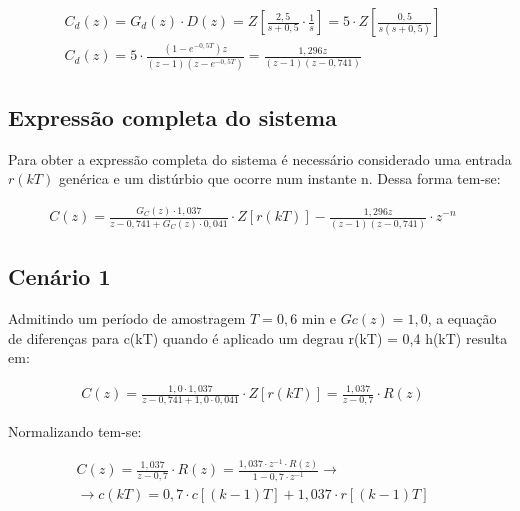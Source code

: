 \documentclass[a4paper,12pt]{article}
\begin{document}
			\begin{equation}
				\left.
				\begin{array}{c}
					\displaystyle C_d(z) = G_d(z) \cdot D(z) = Z\left[\frac{2,5}{s+0,5} \cdot \frac{1}{s} \right] = 5 \cdot Z\left[\frac{0,5}{s(s+0,5)} \right] \\[20pt]
					\displaystyle C_d(z) = 5 \cdot \frac{(1 - e^{-0,5T})z}{(z-1)(z-e^{-0,5T})} = \frac{1,296z}{(z-1)(z-0,741)}
				\end{array}
				\right.
				\quad 
			\end{equation}
			
		\subsection{Expressão completa do sistema}
			Para obter a expressão completa do sistema é necessário considerado uma entrada $r(kT)$ genérica e um distúrbio que ocorre num instante n. Dessa forma tem-se:
			
			\begin{equation}
				\left.
				\begin{array}{c}
					\displaystyle C(z) = \frac{G_C(z) \cdot 1,037}{z - 0,741 + G_C(z) \cdot 0,041} \cdot Z\left[r(kT)\right] - \frac{1,296z}{(z-1)(z-0,741)} \cdot z^{-n}
				\end{array}
				\right.
				\quad 
			\end{equation}
	
		\subsection{Cenário 1}
		
			Admitindo um período de amostragem $T = 0,6$ min e $Gc(z) = 1,0$, a equação de diferenças para c(kT) quando é aplicado um degrau r(kT) = 0,4 h(kT) resulta em:
			
			\begin{equation}
				\left.
				\begin{array}{c}
					\displaystyle C(z) = \frac{1,0 \cdot 1,037}{z - 0,741 + 1,0 \cdot 0,041} \cdot Z\left[r(kT)\right] = \frac{1,037}{z - 0,7} \cdot R(z)
				\end{array}
				\right.
				\quad 
			\end{equation}
			
			Normalizando tem-se:
			
			\begin{equation}
				\left.
				\begin{array}{c}
					\displaystyle C(z) = \frac{1,037}{z - 0,7} \cdot R(z) = \frac{1,037 \cdot z^{-1} \cdot R(z)}{1 - 0,7 \cdot z^{-1}}  \rightarrow \\[20pt]
					\rightarrow \displaystyle c(kT) = 0,7\cdot c[(k-1)T] + 1,037 \cdot r[(k-1)T]
				\end{array}
				\right.
				\quad 
			\end{equation}
			
\end{document}

